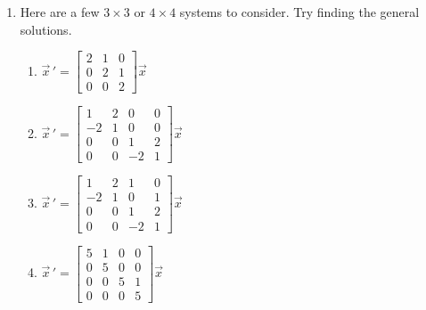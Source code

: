 \documentclass[12pt]{article}
\newcommand{\be}{\begin{enumerate}}
\newcommand{\ee}{\end{enumerate}}
\begin{document}
\begin{enumerate}
  \item Here are a few $3\times3$ or $4\times4$ systems to consider. Try finding the general solutions.
  \be
   \item $\vec x\,'=\begin{bmatrix}2 & 1 & 0\\ 0 & 2 & 1 \\ 0 & 0 & 2 \end{bmatrix}\vec x$
   \item $\vec x\,'=\begin{bmatrix} 1 & 2 & 0 & 0\\ -2 & 1 & 0 &0 \\ 0 & 0 & 1 & 2 \\ 0 & 0 & -2 & 1 \end{bmatrix}\vec x$
   \item $\vec x\,'=\begin{bmatrix} 1 & 2 & 1 & 0\\ -2 & 1 & 0 &1 \\ 0 & 0 & 1 & 2 \\ 0 & 0 & -2 & 1 \end{bmatrix}\vec x$
   \item $\vec x\,'=\begin{bmatrix} 5 & 1 & 0 & 0 \\ 0 & 5 & 0 & 0 \\ 0 & 0 & 5 & 1 \\ 0 & 0 & 0 & 5 \end{bmatrix}\vec x$
  \ee
 
 \end{enumerate}
\end{document}
